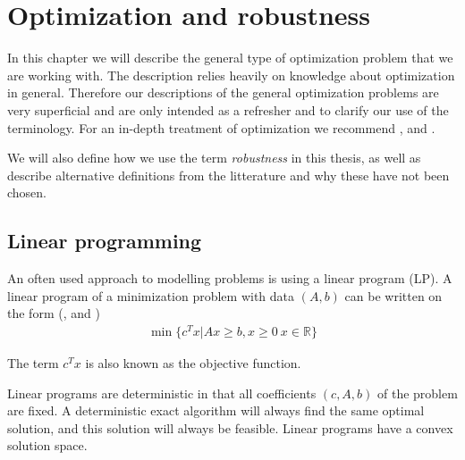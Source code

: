 \chapter{Optimization and robustness}
\label{sec:foundation}

In this chapter we will describe the general type of optimization
problem that we are working with. The description relies heavily on
knowledge about optimization in general. Therefore our descriptions of the
general optimization problems are very superficial and are only intended as a refresher and to clarify our
use of the terminology. For an in-depth treatment of optimization we
recommend \cite{wolsey}, \cite{taha} and \cite{cormen}.

We will also define how we use the term \emph{robustness} in this
thesis, as well as describe alternative definitions from the litterature and
why these have not been chosen.

\section{Linear programming}
\label{sec:linear_programming}

An often used approach to modelling problems is using a linear program
(LP). A linear program of a minimization problem with data $(A,b)$ can
be written on the form (\cite{cormen}, \cite{taha} and
\cite{wolsey})
\begin{eqnarray}\label{eqn:lp}
\min \lbrace c^T x \vert Ax\geq b, x\geq 0\ x\in\mathbb{R} \rbrace
\end{eqnarray}

The term $c^T x$ is also known as the objective function.

Linear programs are deterministic in that all coefficients $(c, A, b)$
of the problem are fixed. A deterministic exact algorithm will always
find the same optimal solution, and this solution will always be
feasible. Linear programs have a convex solution space.

%
%
